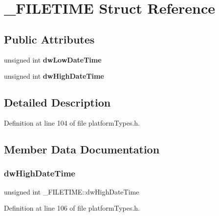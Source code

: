 \hypertarget{struct___f_i_l_e_t_i_m_e}{}\section{\+\_\+\+F\+I\+L\+E\+T\+I\+ME Struct Reference}
\label{struct___f_i_l_e_t_i_m_e}
\subsection*{Public Attributes}
\begin{DoxyCompactItemize}
\item 
\mbox{\label{struct___f_i_l_e_t_i_m_e_aefb0835cecf5918f0633847df1a98ca6}} 
unsigned int {\bfseries dw\+Low\+Date\+Time}
\item 
\mbox{\label{struct___f_i_l_e_t_i_m_e_a7ea84e3655a56e32286005f5a9961d86}} 
unsigned int {\bfseries dw\+High\+Date\+Time}
\end{DoxyCompactItemize}


\subsection{Detailed Description}


Definition at line 104 of file platform\+Types.\+h.



\subsection{Member Data Documentation}
\mbox{\label{struct___f_i_l_e_t_i_m_e_a7ea84e3655a56e32286005f5a9961d86}} 
\subsubsection{\texorpdfstring{dw\+High\+Date\+Time}{dwHighDateTime}}
{\footnotesize\ttfamily unsigned int \+\_\+\+F\+I\+L\+E\+T\+I\+M\+E\+::dw\+High\+Date\+Time}



Definition at line 106 of file platform\+Types.\+h.

